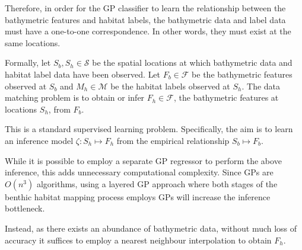 			Therefore, in order for the GP classifier to learn the relationship between the bathymetric features and habitat labels, the bathymetric data and label data must have a one-to-one correspondence. In other words, they must exist at the same locations. 
			
			Formally, let $S_{b}, S_{h} \in \mathcal{S}$ be the spatial locations at which bathymetric data and habitat label data have been observed. Let $F_{b} \in \mathcal{F}$ be the bathymetric features observed at $S_{b}$ and $M_{h} \in \mathcal{M}$ be the habitat labels observed at $S_{h}$. The data matching problem is to obtain or infer $F_{h} \in \mathcal{F}$, the bathymetric features at locations $S_{h}$, from $F_{b}$.
			
			This is a standard supervised learning problem. Specifically, the aim is to learn an inference model $\zeta: S_{h} \mapsto F_{h}$ from the empirical relationship $S_{b} \mapsto F_{b}$.
			
			While it is possible to employ a separate GP regressor to perform the above inference, this adds unnecessary computational complexity. Since GPs are $O(n^{3})$ algorithms, using a layered GP approach where both stages of the benthic habitat mapping process employs GPs will increase the inference bottleneck.
			
			Instead, as there exists an abundance of bathymetric data, without much loss of accuracy it suffices to employ a nearest neighbour interpolation to obtain $F_{h}$. 
			
%			
%			
			
